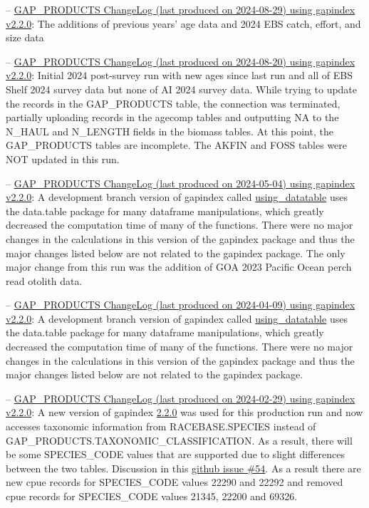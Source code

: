 \documentclass[
  letterpaper,
  oneside,
  open=any]{scrbook}
\begin{document}
--
\href{https://raw.githubusercontent.com/afsc-gap-products/gap_products/main/content/intro-news/2024-08-29.txt}{GAP\_PRODUCTS
ChangeLog (last produced on 2024-08-29) using gapindex v2.2.0}: The
additions of previous years' age data and 2024 EBS catch, effort, and
size data

--
\href{https://raw.githubusercontent.com/afsc-gap-products/gap_products/main/content/intro-news/2024-08-20.txt}{GAP\_PRODUCTS
ChangeLog (last produced on 2024-08-20) using gapindex v2.2.0}: Initial
2024 post-survey run with new ages since last run and all of EBS Shelf
2024 survey data but none of AI 2024 survey data. While trying to update
the records in the GAP\_PRODUCTS table, the connection was terminated,
partially uploading records in the agecomp tables and outputting NA to
the N\_HAUL and N\_LENGTH fields in the biomass tables. At this point,
the GAP\_PRODUCTS tables are incomplete. The AKFIN and FOSS tables were
NOT updated in this run.

--
\href{https://raw.githubusercontent.com/afsc-gap-products/gap_products/main/content/intro-news/2024-05-04.txt}{GAP\_PRODUCTS
ChangeLog (last produced on 2024-05-04) using gapindex v2.2.0}: A
development branch version of gapindex called
\href{https://github.com/afsc-gap-products/gap_products/tree/using_datatable}{using\_datatable}
uses the data.table package for many dataframe manipulations, which
greatly decreased the computation time of many of the functions. There
were no major changes in the calculations in this version of the
gapindex package and thus the major changes listed below are not related
to the gapindex package. The only major change from this run was the
addition of GOA 2023 Pacific Ocean perch read otolith data.

--
\href{https://raw.githubusercontent.com/afsc-gap-products/gap_products/main/content/intro-news/2024-04-09.txt}{GAP\_PRODUCTS
ChangeLog (last produced on 2024-04-09) using gapindex v2.2.0}: A
development branch version of gapindex called
\href{https://github.com/afsc-gap-products/gap_products/tree/using_datatable}{using\_datatable}
uses the data.table package for many dataframe manipulations, which
greatly decreased the computation time of many of the functions. There
were no major changes in the calculations in this version of the
gapindex package and thus the major changes listed below are not related
to the gapindex package.

--
\href{https://raw.githubusercontent.com/afsc-gap-products/gap_products/main/content/intro-news/2024-02-29.txt}{GAP\_PRODUCTS
ChangeLog (last produced on 2024-02-29) using gapindex v2.2.0}: A new
version of gapindex
\href{https://github.com/afsc-gap-products/gapindex/releases/tag/v2.2.0}{2.2.0}
was used for this production run and now accesses taxonomic information
from RACEBASE.SPECIES instead of
GAP\_PRODUCTS.TAXONOMIC\_CLASSIFICATION. As a result, there will be some
SPECIES\_CODE values that are supported due to slight differences
between the two tables. Discussion in this
\href{https://github.com/afsc-gap-products/gapindex/issues/54}{github
issue \#54}. As a result there are new cpue records for SPECIES\_CODE
values 22290 and 22292 and removed cpue records for SPECIES\_CODE values
21345, 22200 and 69326.
\end{document}

